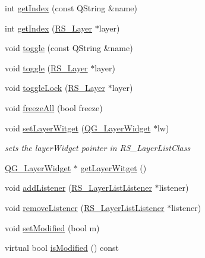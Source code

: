 \begin{DoxyCompactItemize}
\item 
int \hyperlink{classRS__LayerList_ad4974fe13444f5eec24457047ea088b1}{get\-Index} (const Q\-String \&name)
\item 
int \hyperlink{classRS__LayerList_a0ba5b51d5a2c22b00eb8da5a1f9c600e}{get\-Index} (\hyperlink{classRS__Layer}{R\-S\-\_\-\-Layer} $\ast$layer)
\item 
void \hyperlink{classRS__LayerList_a543a68fa388dbfb45570fcc748bad567}{toggle} (const Q\-String \&name)
\item 
void \hyperlink{classRS__LayerList_aa9a1916116b5ae881f1f3ddad20e66ee}{toggle} (\hyperlink{classRS__Layer}{R\-S\-\_\-\-Layer} $\ast$layer)
\item 
void \hyperlink{classRS__LayerList_aa175cb2f6f286938a5932c9fcc4b6a98}{toggle\-Lock} (\hyperlink{classRS__Layer}{R\-S\-\_\-\-Layer} $\ast$layer)
\item 
void \hyperlink{classRS__LayerList_ae270786a424697bd6f8cb2f4472e437b}{freeze\-All} (bool freeze)
\item 
\hypertarget{classRS__LayerList_a7dfdbba6c494c749caf47579d0bc5ee6}{void \hyperlink{classRS__LayerList_a7dfdbba6c494c749caf47579d0bc5ee6}{set\-Layer\-Witget} (\hyperlink{classQG__LayerWidget}{Q\-G\-\_\-\-Layer\-Widget} $\ast$lw)}\label{classRS__LayerList_a7dfdbba6c494c749caf47579d0bc5ee6}

\begin{DoxyCompactList}\small\item\em sets the layer\-Widget pointer in R\-S\-\_\-\-Layer\-List\-Class \end{DoxyCompactList}\item 
\hyperlink{classQG__LayerWidget}{Q\-G\-\_\-\-Layer\-Widget} $\ast$ \hyperlink{classRS__LayerList_a1024cde80fcc46474307becef683a6fc}{get\-Layer\-Witget} ()
\item 
void \hyperlink{classRS__LayerList_ab0712cfcdbe37b37d7ad153ec28d129c}{add\-Listener} (\hyperlink{classRS__LayerListListener}{R\-S\-\_\-\-Layer\-List\-Listener} $\ast$listener)
\item 
void \hyperlink{classRS__LayerList_a1e8717d29fce8fde4b56858f2af91693}{remove\-Listener} (\hyperlink{classRS__LayerListListener}{R\-S\-\_\-\-Layer\-List\-Listener} $\ast$listener)
\item 
void \hyperlink{classRS__LayerList_ad07860fe9b2be449f77578e73592391b}{set\-Modified} (bool m)
\item 
virtual bool \hyperlink{classRS__LayerList_a5626e7e951f2b187fc25e9488af75034}{is\-Modified} () const 
\end{DoxyCompactItemize}
